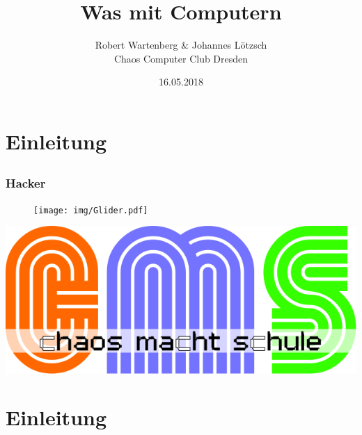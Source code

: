 \documentclass[12pt]{beamer}
\title{Was mit Computern}
\author{\small Robert Wartenberg \& Johannes Lötzsch\\\large Chaos Computer Club Dresden}
\date{16.05.2018}
\begin{document}
\maketitle

\section{Einleitung}
\subsection{}

\begin{frame}
  \frametitle{Hacker}
  \begin{figure}
    \texttt{[image: img/Glider.pdf]}
  \end{figure}
\end{frame}

\begin{frame}
	\begin{center}
    	\includegraphics[height=0.5\textheight]{img/cms-text.png}
    \end{center}
\end{frame}

\section{Einleitung}
	\subsection{}
\end{document}
